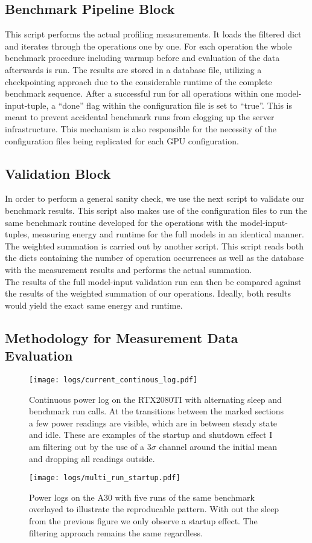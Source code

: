\documentclass[conference]{IEEEtran}
\begin{document}
\subsection{Benchmark Pipeline Block}
This script performs the actual profiling measurements. It loads the filtered dict and iterates through the operations one by one. For each operation the whole benchmark procedure including warmup before and evaluation of the data afterwards is run. The results are stored in a database file, utilizing a checkpointing approach due to the considerable runtime of the complete benchmark sequence. After a successful run for all operations within one model-input-tuple, a “done” flag within the configuration file is set to “true”. This is meant to prevent accidental benchmark runs from clogging up the server infrastructure. This mechanism is also responsible for the necessity of the configuration files being replicated for each GPU configuration. \\

\subsection{Validation Block}
In order to perform a general sanity check, we use the next script to validate our benchmark results. This script also makes use of the configuration files to run the same benchmark routine developed for the operations with the model-input-tuples, measuring energy and runtime for the full models in an identical manner. \\
The weighted summation is carried out by another script. This script reads both the dicts containing the number of operation occurrences as well as the database with the measurement results and performs the actual summation. \\
The results of the full model-input validation run can then be compared against the results of the weighted summation of our operations. Ideally, both results would yield the exact same energy and runtime. \\

\subsection{Methodology for Measurement Data Evaluation}

\begin{figure}
    \texttt{[image: logs/current\_continous\_log.pdf]}
    \caption{Continuous power log on the RTX2080TI with alternating sleep and benchmark run calls. At the transitions between the marked sections a few power readings are visible, which are in between steady state and idle. These are examples of the startup and shutdown effect I am filtering out by the use of a $3 \sigma$ channel around the initial mean and dropping all readings outside.}
    \label{fig:startup1}
    \texttt{[image: logs/multi\_run\_startup.pdf]}
    \caption{Power logs on the A30 with five runs of the same benchmark overlayed to illustrate the reproducable pattern. With out the sleep from the previous figure we only observe a startup effect. The filtering approach remains the same regardless.}
    \label{fig:startup2}
\end{figure}
\end{document}
